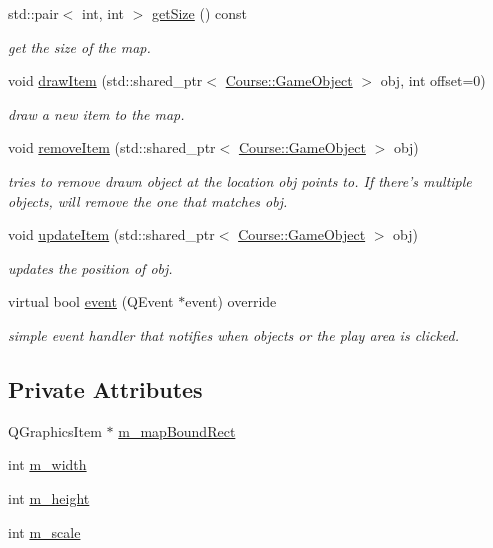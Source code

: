 \begin{DoxyCompactItemize}
std\-::pair$<$ int, int $>$ \hyperlink{classGame_1_1GameScene_a37600217cb1b38b3188e40a52af166ff}{get\-Size} () const 
\begin{DoxyCompactList}\small\item\em get the size of the map. \end{DoxyCompactList}\item 
void \hyperlink{classGame_1_1GameScene_a1ec48db92996894288224918a9030790}{draw\-Item} (std\-::shared\-\_\-ptr$<$ \hyperlink{classCourse_1_1GameObject}{Course\-::\-Game\-Object} $>$ obj, int offset=0)
\begin{DoxyCompactList}\small\item\em draw a new item to the map. \end{DoxyCompactList}\item 
void \hyperlink{classGame_1_1GameScene_ad95d0d9226a3912889443a3c7bd80308}{remove\-Item} (std\-::shared\-\_\-ptr$<$ \hyperlink{classCourse_1_1GameObject}{Course\-::\-Game\-Object} $>$ obj)
\begin{DoxyCompactList}\small\item\em tries to remove drawn object at the location obj points to. If there's multiple objects, will remove the one that matches obj. \end{DoxyCompactList}\item 
void \hyperlink{classGame_1_1GameScene_ac0f74939076d910e28907cb26c6ae9c2}{update\-Item} (std\-::shared\-\_\-ptr$<$ \hyperlink{classCourse_1_1GameObject}{Course\-::\-Game\-Object} $>$ obj)
\begin{DoxyCompactList}\small\item\em updates the position of obj. \end{DoxyCompactList}\item 
virtual bool \hyperlink{classGame_1_1GameScene_a1d87227ccf428f158f848d44cad55b72}{event} (Q\-Event $\ast$event) override
\begin{DoxyCompactList}\small\item\em simple event handler that notifies when objects or the play area is clicked. \end{DoxyCompactList}\end{DoxyCompactItemize}
\subsection*{Private Attributes}
\begin{DoxyCompactItemize}
\item 
Q\-Graphics\-Item $\ast$ \hyperlink{classGame_1_1GameScene_ac6fd0bea8129c9b61b8418324f371e16}{m\-\_\-map\-Bound\-Rect}
\item 
int \hyperlink{classGame_1_1GameScene_aff9acff4c58359bddb14bffec789d78b}{m\-\_\-width}
\item 
int \hyperlink{classGame_1_1GameScene_a86406ae913fa1410adee082dcfa27486}{m\-\_\-height}
\item 
int \hyperlink{classGame_1_1GameScene_ab88ed80cd4feb3838bca9221a15b478f}{m\-\_\-scale}
\end{DoxyCompactItemize}


